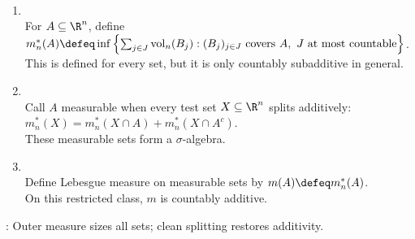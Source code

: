 \begin{method} \label{meth:lebesgue-measure-construction} \\
\begin{enumerate}[label=(\roman*)]
\setlength{\itemsep}{0pt}
\item {}\\
For $A\subseteq\R^n$, define $m_n^\ast(A)\defeq\inf\left\{\sum_{j\in J}\operatorname{vol}_n(B_j):(B_j)_{j\in J}\text{ covers }A,\ J\text{ at most countable}\right\}$.\\
This is defined for every set, but it is only countably subadditive in general.
\item {}\\
Call $A$ measurable when every test set $X\subseteq\R^n$ splits additively: $m_n^\ast(X)=m_n^\ast(X\cap A)+m_n^\ast(X\cap A^c)$.\\
These measurable sets form a $\sigma$-algebra.
\item {}\\
Define Lebesgue measure on measurable sets by $m(A)\defeq m_n^\ast(A)$.\\
On this restricted class, $m$ is countably additive.
\end{enumerate}
: Outer measure sizes all sets; clean splitting restores additivity.
\end{method}

